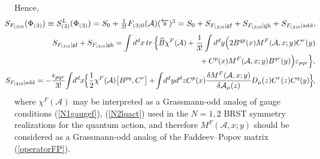 \documentclass[10pt]{article}
\begin{document}
Hence,
\begin{eqnarray}\label{F(A)o}
\hspace{-0.5em} &\hspace{-0.9em}&\hspace{-0.9em}
S_{F_{(3)0}}(\Phi_{(3)} ) \equiv S^L_{(3)}(\Phi_{(3)}) = S_0+ \textstyle\frac{1}{3!}%
F_{(3)0}(\mathcal{A}) (\overleftarrow{s})^3 = S_0+ S_{F_{(3)0}|\mathrm{gf}} +  S_{F_{(3)0}|\mathrm{gh}}+  S_{F_{(3)0}|\mathrm{add}}  , \end{eqnarray}
\vspace{-1ex}
\begin{eqnarray}
\hspace{-0.5em} &\hspace{-0.9em}&\hspace{-0.9em}
S_{F_{(3)0}|\mathrm{gf}} +  S_{F_{(3)0}|\mathrm{gh}}   = \int d^d x\, tr\,  \Big\{ \widehat{B} \chi^F(\mathcal{A})  +  \frac{1}{3!}\int d^d y   \Big(  2B^{qp}(x)M^F(\mathcal{A},x;y) C^r(y)  \nonumber \\
\hspace{-0.5em} &\hspace{-0.9em}&\hspace{-0.9em}\phantom{S_{F_{(3)0}|\mathrm{gf}} +  S_{F_{(3)0}|\mathrm{gh}}  } +C^{p}(x)M^F(\mathcal{A},x;y) B^{qr}(y) \Big)\varepsilon_{pqr}\Big\}
 ,\label{Sgh3o}\\
\hspace{-0.9em} &\hspace{-0.9em}&\hspace{-0.9em}
S_{F_{(3)0}|\mathrm{add}}   = -\frac{\epsilon_{pqr}}{3!}\hspace{-0.2em}\int \hspace{-0.2em}d^{d}x \hspace{-0.1em} \Big\{\frac{1}{2}\chi^F(\mathcal{A}) \big[B^{pq}, C^r\big] +\hspace{-0.15em}\int \hspace{-0.15em}d^{d}y d^dz C^p(x) \frac{\delta M^F(\mathcal{A},x;y)}{\delta \mathcal{A}_{\mu
}(z)}D_\mu(z) C^r(z)  C^{q}(y) \hspace{-0.1em}\Big\}\hspace{-0.1em} ,  \label{Sadd3o}
\end{eqnarray}
where $\chi^F(\mathcal{A})$ may be interpreted as a Grassmann-odd analog of gauge conditions (\ref{N1gaugef}), (\ref{N2lqact})
used in the $N=1, 2$ BRST symmetry realizations for the quantum action, and therefore
$M^F(\mathcal{A},x;y)$ should be considered as a Grassmann-odd analog of
the Faddeev--Popov matrix (\ref{operatorFP}).
\end{document}
